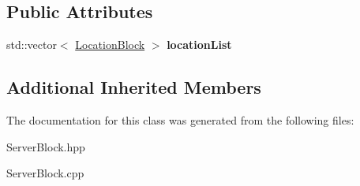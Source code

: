 \subsection*{Public Attributes}
\begin{DoxyCompactItemize}
\item 
\mbox{\label{classft_1_1ServerBlock_a7134ce4f1c2f6b150a923862ce63e110}} 
std\+::vector$<$ \hyperlink{classft_1_1LocationBlock}{Location\+Block} $>$ {\bfseries location\+List}
\end{DoxyCompactItemize}
\subsection*{Additional Inherited Members}


The documentation for this class was generated from the following files\+:\begin{DoxyCompactItemize}
\item 
Server\+Block.\+hpp\item 
Server\+Block.\+cpp\end{DoxyCompactItemize}
